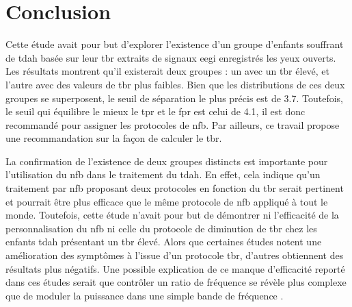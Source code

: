 \section{Conclusion}

Cette étude avait pour but d'explorer l'existence d'un groupe d'enfants souffrant de \gls{tdah} basée sur leur \gls{tbr} extraits de signaux \gls{eegi} enregistrés les yeux 
ouverts. Les résultats montrent qu'il existerait deux groupes : un avec un \gls{tbr} élevé, et l'autre avec des valeurs de \gls{tbr} plus faibles. Bien que les 
distributions de ces deux groupes se superposent, le seuil de séparation le plus précis est de 3.7. Toutefois, le seuil qui équilibre le mieux
le \gls{tpr} et le \gls{fpr} est celui de 4.1, il est donc recommandé pour assigner les protocoles de \gls{nfb}. Par ailleurs, ce travail propose
une recommandation sur la façon de calculer le \gls{tbr}. 

La confirmation de l'existence de deux groupes distincts est importante pour l'utilisation du \gls{nfb} dans le traitement du \gls{tdah}. En effet, cela indique 
qu'un traitement par \gls{nfb} proposant deux protocoles en fonction du \gls{tbr} serait pertinent et pourrait être plus efficace que le même protocole 
de \gls{nfb} appliqué à tout le monde. Toutefois, cette étude n'avait pour but de démontrer ni l'efficacité de la personnalisation du \gls{nfb} ni celle du protocole de diminution de \gls{tbr} chez les 
enfants \gls{tdah} présentant un \gls{tbr} élevé. Alors que certaines études notent une amélioration des symptômes à l'issue d'un protocole \gls{tbr}, 
d'autres obtiennent des résultats plus négatifs. Une possible explication de ce manque d'efficacité reporté dans ces études serait que contrôler 
un ratio de fréquence se révèle plus complexe que de moduler la puissance dans une simple bande de fréquence \citep{Rogala2016}. 
